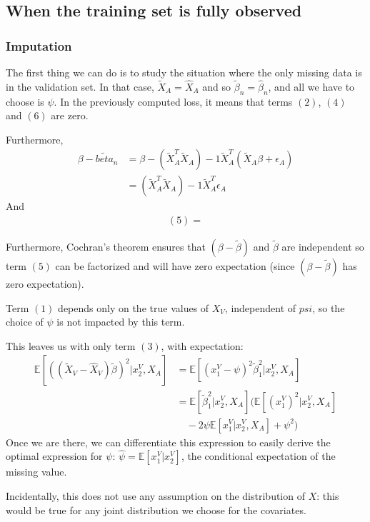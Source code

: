 


		\subsection{When the training set is fully observed}
			\subsubsection{Imputation}
The first thing we can do is to study the situation where the only missing data is in the validation set. In that case, $\tilde{X}_A = \hat{X}_A$ and so $\tilde{\beta}_n = \hat{\beta}_n$, and all we have to choose is $\psi$. In the previously computed loss, it means that terms $(2)$, $(4)$ and $(6)$ are zero.

Furthermore, 
\begin{align*}
\beta -\tilde{beta}_n &= \beta - (\tilde{X}_A^T \tilde{X}_A)-1 \tilde{X}_A^T (\tilde{X}_A \beta + \epsilon_A)\\
					&= (\tilde{X}_A^T \tilde{X}_A)-1 \tilde{X}_A^T \epsilon_A
\end{align*}
And 
\begin{align*}
(5) =  
\end{align*}

Furthermore, Cochran's theorem ensures that $(\beta - \tilde{\beta})$ and $\tilde{\beta}$ are independent so term $(5)$ can be factorized and will have zero expectation (since $(\beta - \tilde{\beta})$ has zero expectation).

Term $(1)$ depends only on the true values of $X_V$, independent of $psi$, so the choice of $\psi$  is not impacted by this term.

This leaves us with only term $(3)$, with expectation:
\begin{align*}
\mathbb{E}[((\tilde{X}_V-\hat{X}_V)\tilde{\beta})^2 \vert x^V_2, X_A] &= \mathbb{E}[(x_1^V - \psi)^2 \tilde{\beta}_1^2 \vert x^V_2, X_A] \\
													&= \mathbb{E}[\tilde{\beta}_1^2 \vert x^V_2, X_A] (\mathbb{E}[(x_1^V)^2\vert x^V_2, X_A] \\
													& \quad - 2\psi \mathbb{E}[x_1^V\vert x^V_2, X_A] + \psi^2)
\end{align*}
Once we are there, we can differentiate this expression to easily derive the optimal expression for $\psi$: $\hat{\psi} = \mathbb{E}[x_1^V\vert x^V_2]$, the conditional expectation of the missing value.

Incidentally, this does not use any assumption on the distribution of $X$: this would be true for any joint distribution we choose for the covariates.

